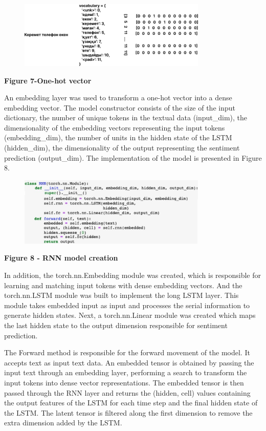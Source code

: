 \begin{figure}[H]
	\centering
	\includegraphics[width=0.8\textwidth]{media/ict/image14}
	\caption*{}
\end{figure}


{\bfseries Figure 7-One-hot vector}

An embedding layer was used to transform a one-hot vector into a dense
embedding vector. The model constructor consists of the size of the
input dictionary, the number of unique tokens in the textual data
(input\_dim), the dimensionality of the embedding vectors representing
the input tokens (embedding\_dim), the number of units in the hidden
state of the LSTM (hidden\_dim), the dimensionality of the output
representing the sentiment prediction (output\_dim). The implementation
of the model is presented in Figure 8.

\begin{figure}[H]
	\centering
	\includegraphics[width=0.8\textwidth]{media/ict/image15}
	\caption*{}
\end{figure}


{\bfseries Figure 8 - RNN model creation}

In addition, the torch.nn.Embedding module was created, which is
responsible for learning and matching input tokens with dense embedding
vectors. And the torch.nn.LSTM module was built to implement the long
LSTM layer. This module takes embedded input as input and processes the
serial information to generate hidden states. Next, a torch.nn.Linear
module was created which maps the last hidden state to the output
dimension responsible for sentiment prediction.

The Forward method is responsible for the forward movement of the model.
It accepts text as input text data. An embedded tensor is obtained by
passing the input text through an embedding layer, performing a search
to transform the input tokens into dense vector representations. The
embedded tensor is then passed through the RNN layer and returns the
(hidden, cell) values containing the output features of the LSTM for
each time step and the final hidden state of the LSTM. The latent tensor
is filtered along the first dimension to remove the extra dimension
added by the LSTM.

